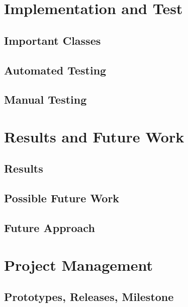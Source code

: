 \documentclass[a4paper,parskip=full]{scrreprt}
\begin{document}
\chapter{Implementation and Test}

\section{Important Classes}

\section{Automated Testing}

\section{Manual Testing}


\chapter{Results and Future Work}

\section{Results}

\section{Possible Future Work}

\section{Future Approach}


\chapter{Project Management}

\section{Prototypes, Releases, Milestone}
\end{document}

